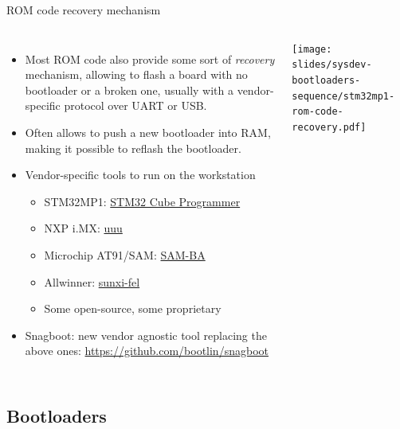 \begin{frame}{ROM code recovery mechanism}
  \begin{columns}
    \footnotesize
    \begin{itemize}
    \item Most ROM code also provide some sort of {\em recovery}
      mechanism, allowing to flash a board with no bootloader or a broken
      one, usually with a vendor-specific protocol over UART or USB.
    \item Often allows to push a new bootloader into RAM, making it
      possible to reflash the bootloader.
    \item Vendor-specific tools to run on the workstation
      \begin{itemize}
      \item STM32MP1: \href{https://www.st.com/en/development-tools/stm32cubeprog.html}{STM32 Cube Programmer}
      \item NXP i.MX: \href{https://github.com/NXPmicro/mfgtools}{uuu}
      \item Microchip AT91/SAM: \href{https://www.microchip.com/en-us/development-tool/SAM-BA-In-system-Programmer}{SAM-BA}
      \item Allwinner: \href{https://github.com/linux-sunxi/sunxi-tools}{sunxi-fel}
      \item Some open-source, some proprietary
      \end{itemize}
    \item Snagboot: new vendor agnostic tool replacing the above ones:
          \url{https://github.com/bootlin/snagboot}
    \end{itemize}
    \texttt{[image: slides/sysdev-bootloaders-sequence/stm32mp1-rom-code-recovery.pdf]}
  \end{columns}
\end{frame}

\subsection{Bootloaders}

